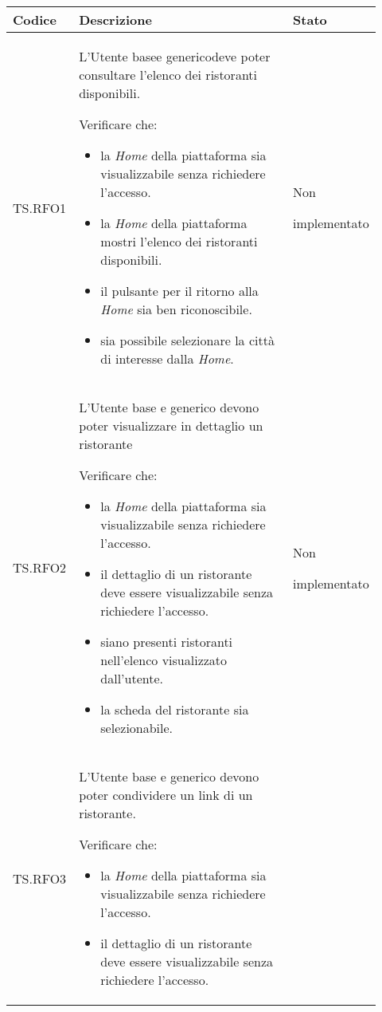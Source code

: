 \fontsize{10}{12}\selectfont
\begin{longtable}{|p{0.10\linewidth}|p{0.70\linewidth}|p{0.12\linewidth}|}
    \hline
	\textbf{Codice} & \textbf{Descrizione} & \textbf{Stato} \\
    \hline
    TS.RFO1 & 
    L'Utente base\g e generico\g deve poter consultare l'elenco dei ristoranti disponibili. \par 
    Verificare che: 
    \begin{itemize}
        \item la \textit{Home} della piattaforma sia visualizzabile senza richiedere l'accesso.
        \item la \textit{Home} della piattaforma mostri l'elenco dei ristoranti disponibili.
        \item il pulsante per il ritorno alla \textit{Home} sia ben riconoscibile.
        \item sia possibile selezionare la città di interesse dalla \textit{Home}.
    \end{itemize}&
    Non \par implementato \\
    \hline
    TS.RFO2 & 
    L'Utente base e generico devono poter visualizzare in dettaglio un ristorante \par 
    Verificare che: 
    \begin{itemize}
        \item la \textit{Home} della piattaforma sia visualizzabile senza richiedere l'accesso.
        \item il dettaglio di un ristorante deve essere visualizzabile senza richiedere l'accesso.
        \item siano presenti ristoranti nell'elenco visualizzato dall'utente.
        \item la scheda del ristorante sia selezionabile.
    \end{itemize}&
    Non \par implementato  \\
    \hline
    TS.RFO3 & 
    L'Utente base e generico devono poter condividere un link di un ristorante. \par 
    Verificare che: 
    \begin{itemize}
        \item la \textit{Home} della piattaforma sia visualizzabile senza richiedere l'accesso.
        \item il dettaglio di un ristorante deve essere visualizzabile senza richiedere l'accesso.

\end{itemize}
\end{longtable}
